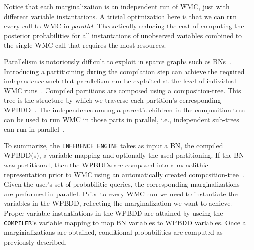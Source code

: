 Notice that each marginalization is an independent run of WMC, just with different variable instantations. A trivial optimization here is that we can run every call to WMC in \emph{parallel}. Theoretically reducing the cost of computing the posterior probabilities for all instantations of unobserved variables combined to the single WMC call that requires the most resources.

Parallelism is notoriously difficult to exploit in sparce graphs such as BNs~\cite{dal2014fast}. Introducing a partitioining during the compilation step can achieve the required independence such that parallelism can be exploited at the level of individual WMC runs~\cite{dal2017reducing}. Compiled partitions are composed using a composition-tree. This tree is the structure by which we traverse each partition's corresponding WPBDD~\cite{dal2021compositional}. The independence among a parent's children in the composition-tree can be used to run WMC in those parts in parallel, i.e., independent sub-trees can run in parallel~\cite{dal2018parallel}.

To summarize, the \texttt{INFERENCE ENGINE} takes as input a BN, the compiled WPBDD(s), a variable mapping and optionally the used partitioning. If the BN was partitioned, then the WPBDDs are composed into a monolithic representation prior to WMC using an automatically created composition-tree~\cite{dal2021compositional}. Given the user's set of probabilitic queries, the corresponding marginalizations are performed in parallel. Prior to every WMC run we need to instantiate the variables in the WPBDD, reflecting the marginalization we want to achieve. Proper variable instantiations in the WPBDD are attained by useing the \texttt{COMPILER}'s variable mapping to map BN variables to WPBDD variables. Once all marginializations are obtained, conditional probabilities are computed as previously described.

